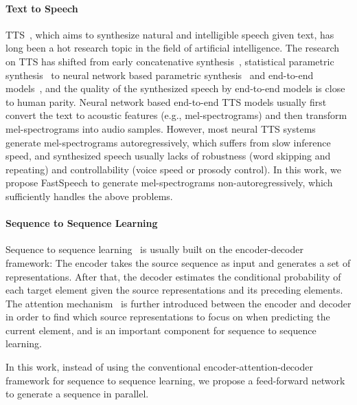 \documentclass{article}
\begin{document}
\paragraph{Text to Speech} \label{bg_tts}
TTS~\citep{arik2017deep,wang2017tacotron,shen2018natural,ping2018clarinet,ren2019almost}, which aims to synthesize natural and intelligible speech given text, has long been a hot research topic in the field of artificial intelligence. The research on TTS has shifted from early concatenative synthesis~\citep{hunt1996unit}, statistical parametric synthesis~\citep{wu2016merlin,li2018emphasis} to neural network based parametric synthesis~\citep{arik2017deep} and end-to-end models~\citep{wang2017tacotron,shen2018natural,li2018close,ping2018clarinet}, and the quality of the synthesized speech by end-to-end models is close to human parity. Neural network based end-to-end TTS models usually first convert the text to acoustic features (e.g., mel-spectrograms) and then transform mel-spectrograms into audio samples. However, most neural TTS systems generate mel-spectrograms autoregressively, which suffers from slow inference speed, and synthesized speech usually lacks of robustness (word skipping and repeating) and controllability (voice speed or prosody control). In this work, we propose FastSpeech to generate mel-spectrograms non-autoregressively, which sufficiently handles the above problems. 


\paragraph{Sequence to Sequence Learning}

Sequence to sequence learning~\citep{DBLP:journals/corr/BahdanauCB14,chan2016listen,vaswani2017attention} is usually built on the encoder-decoder framework: The encoder takes the source sequence as input and generates a set of representations. After that, the decoder estimates the conditional probability of each target element given the source representations and its preceding elements. The attention mechanism~\citep{DBLP:journals/corr/BahdanauCB14} is further introduced between the encoder and decoder in order to find which source representations to focus on when predicting the current element, and is an important component for sequence to sequence learning.

In this work, instead of using the conventional encoder-attention-decoder framework for sequence to sequence learning, we propose a feed-forward network to generate a sequence in parallel.
\end{document}
